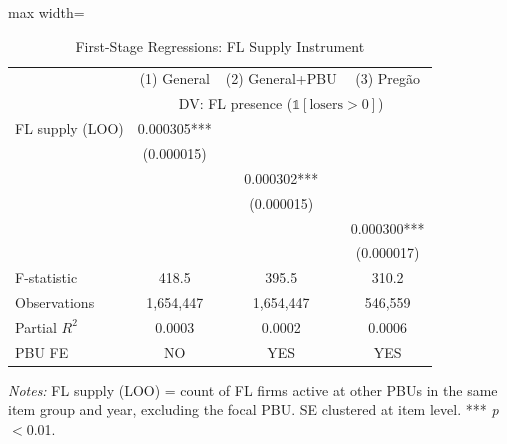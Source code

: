 \begin{table}[htbp]
\centering
\caption{First-Stage Regressions: FL Supply Instrument}
\label{tab:iv_first_stage}
\begin{adjustbox}{max width=\textwidth}
\begin{threeparttable}
\small
\begin{tabular}{lccc}
\toprule
 & (1) General & (2) General+PBU & (3) Preg\~{a}o \\
 & \multicolumn{3}{c}{DV: FL presence ($\mathbb{1}[\text{losers} > 0]$)} \\
\midrule
FL supply (LOO) & 0.000305*** & & \\
 & (0.000015) & & \\
 & & 0.000302*** & \\
 & & (0.000015) & \\
 & & & 0.000300*** \\
 & & & (0.000017) \\
\midrule
F-statistic & 418.5 & 395.5 & 310.2 \\
Observations & 1,654,447 & 1,654,447 & 546,559 \\
Partial $R^2$ & 0.0003 & 0.0002 & 0.0006 \\
PBU FE & NO & YES & YES \\
\bottomrule
\end{tabular}
\begin{tablenotes}
\small
\item \textit{Notes:} FL supply (LOO) = count of FL firms active at other PBUs
in the same item group and year, excluding the focal PBU.
SE clustered at item level. *** \textit{p}$<$0.01.
\end{tablenotes}
\end{threeparttable}
\end{adjustbox}
\end{table}
